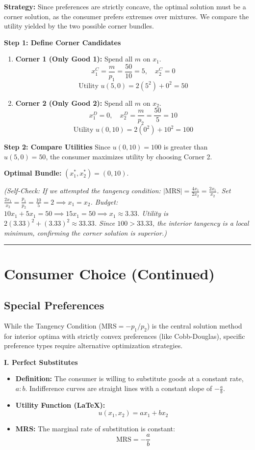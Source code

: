 \documentclass{article}
\begin{document}
\textbf{Strategy:} Since preferences are strictly concave, the optimal solution must be a corner solution, as the consumer prefers extremes over mixtures. We compare the utility yielded by the two possible corner bundles.

\textbf{Step 1: Define Corner Candidates}
\begin{enumerate}
    \item \textbf{Corner 1 (Only Good 1):} Spend all $m$ on $x_1$.
    \[ x_1^C = \frac{m}{p_1} = \frac{50}{10} = 5, \quad x_2^C = 0 \]
    \[ \text{Utility } u(5, 0) = 2(5^2) + 0^2 = 50 \]
    \item \textbf{Corner 2 (Only Good 2):} Spend all $m$ on $x_2$.
    \[ x_1^D = 0, \quad x_2^D = \frac{m}{p_2} = \frac{50}{5} = 10 \]
    \[ \text{Utility } u(0, 10) = 2(0^2) + 10^2 = 100 \]
\end{enumerate}

\textbf{Step 2: Compare Utilities} Since $u(0, 10) = 100$ is greater than $u(5, 0) = 50$, the consumer maximizes utility by choosing Corner 2.

\textbf{Optimal Bundle:} $(x_1^*, x_2^*) = (0, 10)$.

\textit{(Self-Check: If we attempted the tangency condition: $|\text{MRS}| = \frac{4x_1}{2x_2} = \frac{2x_1}{x_2}$. Set $\frac{2x_1}{x_2} = \frac{p_1}{p_2} = \frac{10}{5} = 2 \implies x_1 = x_2$. Budget: $10x_1 + 5x_1 = 50 \implies 15x_1 = 50 \implies x_1 \approx 3.33$. Utility is $2(3.33)^2 + (3.33)^2 \approx 33.33$. Since $100 > 33.33$, the interior tangency is a local minimum, confirming the corner solution is superior.)}

\noindent\rule{\linewidth}{0.4pt}

\section{Consumer Choice (Continued)}
\subsection{Special Preferences}

While the Tangency Condition ($\text{MRS} = -p_1/p_2$) is the central solution method for interior optima with strictly convex preferences (like Cobb-Douglas), specific preference types require alternative optimization strategies.

\noindent\textbf{I. Perfect Substitutes}
\begin{itemize}
    \item \textbf{Definition:} The consumer is willing to substitute goods at a constant rate, $a:b$. Indifference curves are straight lines with a constant slope of $-\frac{a}{b}$.
    \item \textbf{Utility Function (LaTeX):} \[u(x_1, x_2) = a x_1 + b x_2\]
    \item \textbf{MRS:} The marginal rate of substitution is constant: \[\text{MRS} = -\frac{a}{b}\]
\end{itemize}
\end{document}
